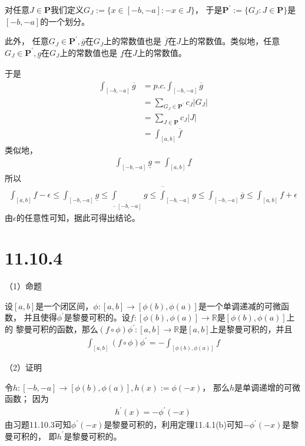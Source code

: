 \documentclass{article}
\begin{document}
对任意$J \in \textbf{P}$我们定义$G_J := \{x \in [-b, -a] : -x \in J\}$，
于是$\textbf{P}^\prime := \{G_J : J \in \textbf{P}\}$是$[-b, -a]$的一个划分。

此外，
任意$G_J \in \textbf{P}^\prime,\overline{g}$在$G_J$上的常数值也是
$\overline{f}$在$J$上的常数值。类似地，任意$G_J \in \textbf{P}^\prime,\underline{g}$在$G_J$上的常数值也是
$\underline{f}$在$J$上的常数值。

于是
\begin{align*}
  \int_{[-b, -a]} \overline{g} & = p.c.\int_{[-b, -a]} \overline{g}                   \\
                               & = \sum \limits_{G_J \in \textbf{P}^\prime} c_J |G_J| \\
                               & = \sum \limits_{J \in \textbf{P}} c_J |J|            \\
                               & = \int_{[a, b]} \overline{f}
\end{align*}
类似地，
\begin{align*}
  \int_{[-b, -a]} \underline{g} = \int_{[a, b]} \underline{f}
\end{align*}
所以
\begin{align*}
  \int_{[a,b]} f - \epsilon
  \leq \int_{[-b, -a]} \underline{g}
  \leq \underline{\int}_{[-b, -a]} g \leq \overline{\int}_{[-b, -a]} g
  \leq \int_{[-b, -a]} \overline{g}
  \leq \int_{[a,b]} f + \epsilon
\end{align*}
由$\epsilon$的任意性可知，据此可得出结论。

\section*{11.10.4}
（1）命题

设$[a, b]$是一个闭区间，$\phi : [a, b] \to [\phi(b), \phi(a)]$是一个单调递减的可微函数，
并且使得$\phi ^\prime$是黎曼可积的。设$f: [\phi(b), \phi(a)] \to \mathbb{R}$是$[\phi(b), \phi(a)]$上的
黎曼可积的函数，那么$(f \circ \phi)\phi^\prime : [a, b] \to \mathbb{R}$是$[a, b]$上是黎曼可积的，并且
\begin{align*}
  \int_{[a, b]} (f \circ \phi) \phi^\prime = - \int_{[\phi(b), \phi(a)]} f
\end{align*}

（2）证明

令$h : [-b, -a] \to [\phi(b), \phi(a)], h(x) := \phi(-x)$，
那么$h$是单调递增的可微函数；
因为
\begin{align*}
  h ^\prime(x) = -\phi^\prime(-x)
\end{align*}
由习题11.10.3可知$\phi^\prime(-x)$是黎曼可积的，利用定理11.4.1(b)可知$-\phi^\prime(-x)$是黎曼可积的，
即$h^\prime$是黎曼可积的。
\end{document}
